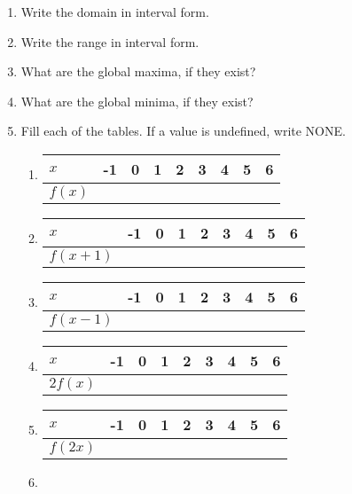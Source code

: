 \documentclass[11pt]{article}
\begin{document}
\begin{enumerate}
\begin{multicols}{2}
\begin{enumerate}
\item Write the domain in interval form.
\item Write the range in interval form.
\item What are the global maxima, if they exist?
\item What are the global minima, if they exist?
\item Fill each of the tables. If a value is undefined, write NONE.
\begin{enumerate}
\item 
\begin{tabular}{|l|l|l|l|l|l|l|l|l|}
\hline
$x$    & -1 & 0 & 1 & 2 & 3 & 4 & 5 & 6 \\ \hline
$f(x)$ &    &   &   &   &   &   &   &   \\ \hline
\end{tabular}
\item 

\begin{tabular}{|l|l|l|l|l|l|l|l|l|}
\hline
$x$    & -1 & 0 & 1 & 2 & 3 & 4 & 5 & 6 \\ \hline
$f(x+1)$ &    &   &   &   &   &   &   &   \\ \hline
\end{tabular}
\item 

\begin{tabular}{|l|l|l|l|l|l|l|l|l|}
\hline
$x$    & -1 & 0 & 1 & 2 & 3 & 4 & 5 & 6 \\ \hline
$f(x-1)$ &    &   &   &   &   &   &   &   \\ \hline
\end{tabular}
\item 

\begin{tabular}{|l|l|l|l|l|l|l|l|l|}
\hline
$x$    & -1 & 0 & 1 & 2 & 3 & 4 & 5 & 6 \\ \hline
$2f(x)$ &    &   &   &   &   &   &   &   \\ \hline
\end{tabular}
\item 

\begin{tabular}{|l|l|l|l|l|l|l|l|l|}
\hline
$x$    & -1 & 0 & 1 & 2 & 3 & 4 & 5 & 6 \\ \hline
$f(2x)$ &    &   &   &   &   &   &   &   \\ \hline
\end{tabular}
\item 


\end{enumerate}
\end{enumerate}
\end{multicols}
\end{enumerate}
\end{document}

